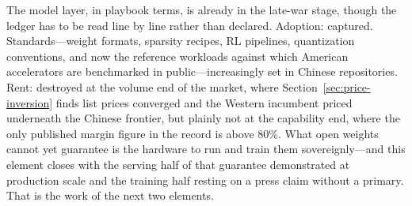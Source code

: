 The model layer, in playbook terms, is already in the late-war stage, though the ledger has to be read line by line rather than declared. Adoption: captured. Standards---weight formats, sparsity recipes, RL pipelines, quantization conventions, and now the reference workloads against which American accelerators are benchmarked in public---increasingly set in Chinese repositories. Rent: destroyed at the volume end of the market, where Section~\ref{sec:price-inversion} finds list prices converged and the Western incumbent priced underneath the Chinese frontier, but plainly not at the capability end, where the only published margin figure in the record is above 80\%. What open weights cannot yet guarantee is the hardware to run and train them sovereignly---and this element closes with the serving half of that guarantee demonstrated at production scale and the training half resting on a press claim without a primary. That is the work of the next two elements.
